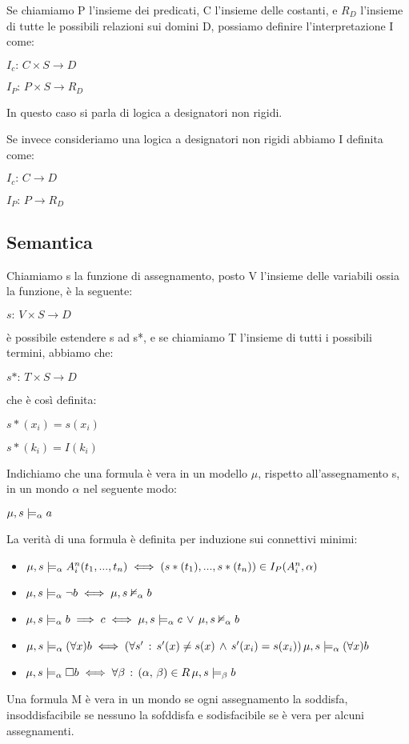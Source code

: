 Se chiamiamo P l'insieme dei predicati, C l'insieme delle costanti,
e $R_{D}$ l'insieme di tutte le possibili relazioni sui domini D,
possiamo definire l'interpretazione I come:

$I_{c}:\, C\times S\longrightarrow D$

$I_{P}:\, P\times S\longrightarrow R_{D}$

In questo caso si parla di logica a designatori non rigidi.

Se invece consideriamo una logica a designatori non rigidi abbiamo
I definita come:

$I_{c}:\, C\longrightarrow D$

$I_{P}:\, P\longrightarrow R_{D}$


\subsection{Semantica}

Chiamiamo s la funzione di assegnamento, posto V l'insieme delle variabili
ossia la funzione, è la seguente:

$s:\, V\times S\longrightarrow D$

è possibile estendere s ad s{*}, e se chiamiamo T l'insieme di tutti
i possibili termini, abbiamo che:

$s*:\, T\times S\longrightarrow D$

che è così definita:

$s*(x_{i})=s(x_{i})$

$s*(k_{i})=I(k_{i})$

Indichiamo che una formula è vera in un modello $\mu$, rispetto all'assegnamento
s, in un mondo $\alpha$ nel seguente modo:

$\mu,s\models_{\alpha}a$

La verità di una formula è definita per induzione sui connettivi minimi:
\begin{itemize}
\item $\mu,s\models_{\alpha}A_{i}^{n}(t_{1},...,t_{n})\iff(s*(t_{1}),...,s*(t_{n}))\in I_{P}(A_{i}^{n},\alpha)$
\item $\mu,s\models_{\alpha}\neg b\iff\mu,s\nvDash_{\alpha}b$
\item $\mu,s\models_{\alpha}b\implies c\iff\mu,s\models_{\alpha}c\,\vee\,\mu,s\nvDash_{\alpha}b$
\item $\mu,s\models_{\alpha}(\forall x)b\iff(\forall s'\,:\, s'(x)\not=s(x)\,\wedge\, s'(x_{i})=s(x_{i}))\,\mu,s\models_{\alpha}(\forall x)b$
\item $\mu,s\models_{\alpha}\square b\iff\forall\beta\,:\,(\alpha,\,\beta)\in R\,\mu,s\models_{\beta}b$
\end{itemize}
Una formula M è vera in un mondo se ogni assegnamento la soddisfa,
insoddisfacibile se nessuno la sofddisfa e sodisfacibile se è vera
per alcuni assegnamenti.

